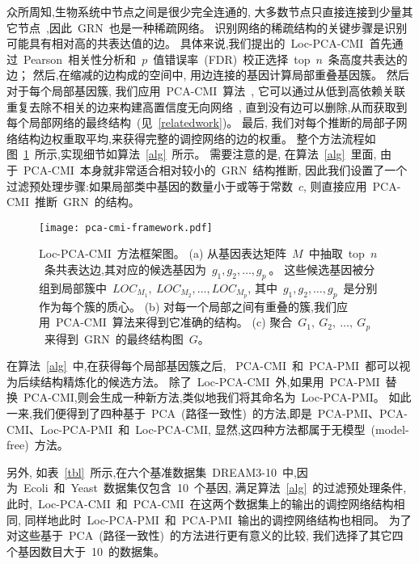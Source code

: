 众所周知,生物系统中节点之间是很少完全连通的,
大多数节点只直接连接到少量其它节点~\cite{jeong2000large},因此~GRN~也是一种稀疏网络。
识别网络的稀疏结构的关键步骤是识别可能具有相对高的共表达值的边。
具体来说,我们提出的~Loc-PCA-CMI~首先通过~Pearson~相关性分析和~$p$~值错误率~(FDR)~校正选择~top~$n$~条高度共表达的边；
然后,在缩减的边构成的空间中, 用边连接的基因计算局部重叠基因簇。
然后对于每个局部基因簇, 我们应用~PCA-CMI~算法~\cite{zhang2011inferring},
它可以通过从低到高依赖关联重复去除不相关的边来构建高置信度无向网络~\cite{spirtes2000causation},
直到没有边可以删除,从而获取到每个局部网络的最终结构~(见~\ref{relatedwork})。
最后, 我们对每个推断的局部子网络结构边权重取平均,来获得完整的调控网络的边的权重。
整个方法流程如图~\ref{pca-cmi-fr}~所示,实现细节如算法~\ref{alg}~所示。
需要注意的是,
在算法~\ref{alg}~里面,
由于~PCA-CMI~本身就非常适合相对较小的~GRN~结构推断,
因此我们设置了一个过滤预处理步骤:如果局部类中基因的数量小于或等于常数~$c$,
则直接应用~PCA-CMI~推断~GRN~的结构。
\begin{figure}[!htbp]
    \centering
    \texttt{[image: pca-cmi-framework.pdf]}
    \caption{Loc-PCA-CMI~方法框架图。
    (a) 从基因表达矩阵~$M$~中抽取~top~$n$~条共表达边,其对应的候选基因为~$g_1,g_2,\ldots,g_{p}~$。
    这些候选基因被分组到局部簇中~$LOC_{M_1},~LOC_{M_2},\ldots,LOC_{M_{p}}$,
    其中~$g_1,g_2,\ldots,g_{p}$~是分别作为每个簇的质心。
    (b) 对每一个局部之间有重叠的簇,我们应用~PCA-CMI~算法来得到它准确的结构。
    (c) 聚合~$G_1,~G_2,~\ldots,~G_p$~来得到~GRN~的最终结构图~$G$。
    }
    \label{pca-cmi-fr}
\end{figure}

在算法~\ref{alg}~中,在获得每个局部基因簇之后,
~PCA-CMI~和~PCA-PMI~都可以视为后续结构精炼化的候选方法。
除了~Loc-PCA-CMI~外,如果用~PCA-PMI~替换~PCA-CMI,则会生成一种新方法,类似地我们将其命名为~Loc-PCA-PMI。
如此一来,我们便得到了四种基于~PCA~(路径一致性)~的方法,即是~PCA-PMI、PCA-CMI、Loc-PCA-PMI~和~Loc-PCA-CMI,
显然,这四种方法都属于无模型~(model-free)~方法。

另外, 如表~\ref{tbl}~所示,在六个基准数据集~DREAM3-10~中,因为~Ecoli~和~Yeast~数据集仅包含~10~个基因,
满足算法~\ref{alg}~的过滤预处理条件,
此时,~Loc-PCA-CMI~和~PCA-CMI~在这两个数据集上的输出的调控网络结构相同,
同样地此时~Loc-PCA-PMI~和~PCA-PMI~输出的调控网络结构也相同。
为了对这些基于~PCA~(路径一致性)~的方法进行更有意义的比较,
我们选择了其它四个基因数目大于~10~的数据集。

